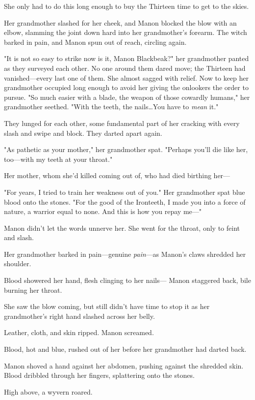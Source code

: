 She only had to do this long enough to buy the Thirteen time to get to the skies.

Her grandmother slashed for her cheek, and Manon blocked the blow with an elbow, slamming the joint down hard into her grandmother's forearm.
The witch barked in pain, and Manon spun out of reach, circling again.

"It is not so easy to strike now is it, Manon Blackbeak?"
her grandmother panted as they surveyed each other.
No one around them dared move; the Thirteen had vanished---every last one of them.
She almost sagged with relief.
Now to keep her grandmother occupied long enough to avoid her giving the onlookers the order to pursue.
"So much easier with a blade, the weapon of those cowardly humans," her grandmother seethed.
"With the teeth, the nails\ldots You have to \emph{mean}
it."

They lunged for each other, some fundamental part of her cracking with every slash and swipe and block.
They darted apart again.

"As pathetic as your mother," her grandmother spat.
"Perhaps you'll die like her, too---with my teeth at your throat."

Her mother, whom she'd killed coming out of, who had died birthing her---

"For years, I tried to train her weakness out of you."
Her grandmother spat blue blood onto the stones.
"For the good of the Ironteeth, I made you into a force of nature, a warrior equal to none.
And this is how you repay me---"

Manon didn't let the words unnerve her.
She went for the throat, only to feint and slash.

Her grandmother barked in pain---genuine \emph{pain}---as Manon's claws shredded her shoulder.

Blood showered her hand, flesh clinging to her nails--- Manon staggered back, bile burning her throat.

She saw the blow coming, but still didn't have time to stop it as her grandmother's right hand slashed across her belly.

Leather, cloth, and skin ripped.
Manon screamed.

Blood, hot and blue, rushed out of her before her grandmother had darted back.

Manon shoved a hand against her abdomen, pushing against the shredded skin.
Blood dribbled through her fingers, splattering onto the stones.

High above, a wyvern roared.

